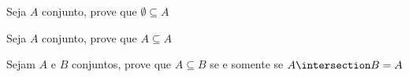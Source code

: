 \begin{exercise}
%
Seja $A$ conjunto, prove que $\emptyset \subseteq A$
\end{exercise}

\begin{exercise}
%
Seja $A$ conjunto, prove que $A \subseteq A$
\end{exercise}

\begin{exercise}
%
Sejam $A$ e $B$ conjuntos, prove que $A \subseteq B$ se e somente se $A \intersection B = A$
\end{exercise}

